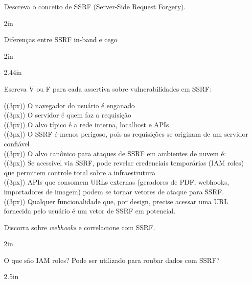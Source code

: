 \documentclass[12pt]{exam}
\begin{document}
	\begin{questions}
		\question Descreva o conceito de SSRF (Server-Side Request Forgery).
			\begin{solutionbox}{2in} \end{solutionbox}
		\question Diferenças entre SSRF in-band e cego
			\begin{solutionbox}{2in} \end{solutionbox}

			\begin{solutionbox}{2.44in} \end{solutionbox}
		\question Escreva V ou F para cada assertiva sobre vulnerabilidades em SSRF:

			(\hspace(3px)) O navegador do usuário é enganado  \\
			(\hspace(3px)) O servidor é quem faz a requisição \\
			(\hspace(3px)) O alvo típico é a rede interna, localhost e APIs\\
			(\hspace(3px)) O SSRF é menos perigoso, pois as requisições se originam de um servidor confiável \\
			(\hspace(3px)) O alvo canônico para ataques de SSRF em ambientes de nuvem é: \\
			(\hspace(3px)) Se acessível via SSRF, pode revelar credenciais temporárias (IAM roles) que permitem
			controle total sobre a infraestrutura \\
			(\hspace(3px)) APIs que consomem URLs externas (geradores de PDF, webhooks, importadores de imagem)
			podem se tornar vetores de ataque para SSRF. \\
			(\hspace(3px)) Qualquer funcionalidade que, por design, precise acessar uma URL fornecida pelo usuário
			é um vetor de SSRF em potencial.

		\question Discorra sobre \textit{webhooks} e correlacione com SSRF. 
			\begin{solutionbox}{2in} \end{solutionbox}

		
		\question O que são IAM roles? Pode ser utilizado para roubar dados com SSRF?
			\begin{solutionbox}{2.5in} \end{solutionbox}


\end{questions}
\end{document}
